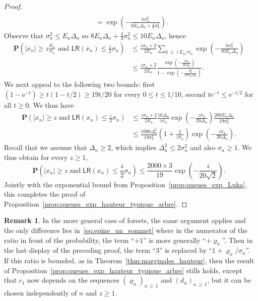 \documentclass[10pt]{amsart}
\theoremstyle{definition}\newtheorem{defi}[theo]{Definition}\newtheorem{rema}[theo]{Remark}\newtheorem{exam}[theo]{Example}\newtheorem{exem}[theo]{Example}\newtheorem{nota}[theo]{Notation}
\newcommand{\ensembles}[1]{\mathbf{#1}}
\renewcommand{\P}{\ensembles{P}}
\renewcommand{\Pr}[1]{\P\left(#1\right)}
\newcommand{\1}{\ensembles{1}}
\renewcommand{\le}{\leqslant}
\renewcommand{\ge}{\geqslant}
\newcommand{\LR}{\mathsf{LR}}
\newcommand{\e}{\mathrm{e}}
\newcommand{\edges}{E}
\providecommand{\?}{}
\begin{document}
\begin{proof}
\begin{align*}
\\
&= \exp\left(- \frac{h \sigma_n^2}{8 \edges_n \Delta_n + \frac{4}{3} \sigma_n^2}\right).
\end{align*}
Observe that $\sigma_n^2 \le \edges_n \Delta_n$ so $8 \edges_n \Delta_n + \frac{4}{3} \sigma_n^2 \le 10 \edges_n \Delta_n$, hence
\begin{align*}
\Pr{|x_n| \ge z \frac{\edges_n}{\sigma_n} \text{ and } \LR(x_n) \le \frac{z}{2} \sigma_n} &\le \frac{z \sigma_n + 2}{2 \edges_n} \sum_{h\,\ge\,z\,\edges_n / \sigma_n} \exp\left(- \frac{h \sigma_n^2}{10 \edges_n \Delta_n}\right)
\\
&\le \frac{z \sigma_n + 2}{2 \edges_n}
\frac{\exp\left(- \frac{z \sigma_n}{10 \Delta_n}\right)}{1 - \exp\left(- \frac{\sigma_n^2}{10 \edges_n \Delta_n}\right)}.
\end{align*}
We next appeal to the following two bounds: first $(1-\e^{-t}) \ge t(1 - t/2) \ge 19t/20$ for every $0 \le t \le 1/10$, second $t \e^{-t} \le \e^{-t/2}$ for all $t \ge 0$. We thus have
\begin{align*}
\Pr{|x_n| \ge z\;\text{and}\; \LR(x_n) \le \frac{z}{2} \sigma_n} &\le \frac{z \sigma_n + 2}{2 \edges_n}
\frac{10 \Delta_n}{z \sigma_n} \exp\left(- \frac{z \sigma_n}{20 \Delta_n}\right)
\frac{200 \edges_n \Delta_n}{19 \sigma_n^2}
\\
&\le \frac{1000 \Delta_n^2}{19 \sigma_n^2} \left(1 + \frac{2}{z \sigma_n}\right)
\exp\left(- \frac{z \sigma_n}{20 \Delta_n}\right).
\end{align*}
Recall that we assume that $\Delta_n \ge 2$, which implies $\Delta_n^2 \le 2 \sigma_n^2$ and also $\sigma_n \ge 1$. We thus obtain for every $z \ge 1$,
\[
\Pr{|x_n| \ge z\;\text{and}\; \LR(x_n) \le \frac{z}{2} \sigma_n}
\le \frac{2000 \times 3}{19} \exp\left(- \frac{z}{20 \sqrt{2}}\right).
\]
Jointly with the exponential bound from Proposition~\ref{prop:queues_exp_Luka}, this completes the proof of Proposition~\ref{prop:queues_exp_hauteur_typique_arbre}.
\end{proof}


\begin{rema}\label{rem:queues_exp_hauteur_typique_foret}
In the more general case of forests, the same argument applies and the only difference lies in~\eqref{eq:epine_un_sommet} where in the numerator of the ratio in front of the probability, the term ``$+1$'' is more generally ``$+\varrho_n$''. Then in the last display of the preceding proof, the term ``$3$'' is replaced by ``$1+\varrho_n/\sigma_n$''. If this ratio is bounded, as in Theorem~\ref{thm:marginales_hauteur}, then the result of Proposition~\ref{prop:queues_exp_hauteur_typique_arbre} stills holds, except that $c_1$ now depends on the sequences $(\varrho_n)_{n\,\ge\,1}$ and $(d_n)_{n\,\ge\,1}$, but it can be chosen independently of $n$ and $z \ge 1$.
\end{rema}
\end{document}

